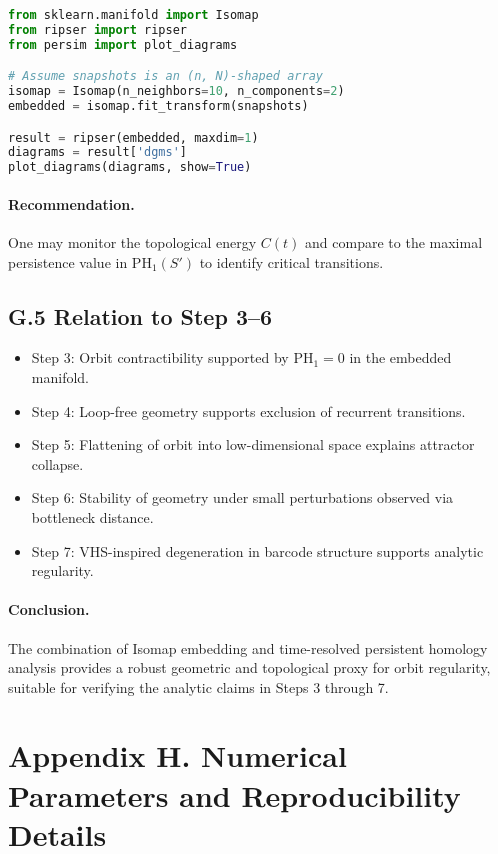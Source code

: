 \documentclass[11pt]{article}
\theoremstyle{definition}
\begin{document}
\begin{lstlisting}[language=Python]
from sklearn.manifold import Isomap
from ripser import ripser
from persim import plot_diagrams

# Assume snapshots is an (n, N)-shaped array
isomap = Isomap(n_neighbors=10, n_components=2)
embedded = isomap.fit_transform(snapshots)

result = ripser(embedded, maxdim=1)
diagrams = result['dgms']
plot_diagrams(diagrams, show=True)
\end{lstlisting}

\paragraph{Recommendation.} One may monitor the topological energy \( C(t) \) and compare to the maximal persistence value in \( \mathrm{PH}_1(S') \) to identify critical transitions.

\subsection*{G.5 Relation to Step 3--6}

\begin{itemize}
  \item Step 3: Orbit contractibility supported by \( \mathrm{PH}_1 = 0 \) in the embedded manifold.
  \item Step 4: Loop-free geometry supports exclusion of recurrent transitions.
  \item Step 5: Flattening of orbit into low-dimensional space explains attractor collapse.
  \item Step 6: Stability of geometry under small perturbations observed via bottleneck distance.
  \item Step 7: VHS-inspired degeneration in barcode structure supports analytic regularity.
\end{itemize}

\paragraph{Conclusion.} The combination of Isomap embedding and time-resolved persistent homology analysis provides a robust geometric and topological proxy for orbit regularity, suitable for verifying the analytic claims in Steps 3 through 7.


\section{Appendix H. Numerical Parameters and Reproducibility Details}
\label{sec:appendixH}
\end{document}
